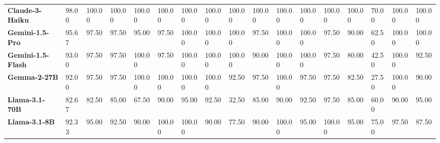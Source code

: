 \begin{table}[h]
\begin{adjustbox}{angle=90}
{\begin{tabular}{lllllllllllllllll}
\textbf{Claude-3-Haiku}    & 98.00                       & 100.00                   & 100.00              & 100.00       & 100.00                     & 100.00             & 100.00               & 100.00                 & 100.00                      & 100.00              & 100.00                     & 100.00                        & 100.00                 & 70.00             & 100.00                    & 100.00             \\
\textbf{Gemini-1.5-Pro}    & 95.67                       & 97.50                    & 97.50               & 95.00        & 97.50                      & 100.00             & 100.00               & 100.00                 & 97.50                       & 100.00              & 100.00                     & 97.50                         & 90.00                  & 62.50             & 100.00                    & 100.00             \\
\textbf{Gemini-1.5-Flash}  & 93.00                       & 97.50                    & 97.50               & 100.00       & 97.50                      & 100.00             & 100.00               & 100.00                 & 90.00                       & 100.00              & 100.00                     & 97.50                         & 80.00                  & 42.50             & 100.00                    & 92.50              \\
\textbf{Gemma-2-27B}       & 92.00                       & 97.50                    & 97.50               & 100.00       & 100.00                     & 100.00             & 100.00               & 92.50                  & 97.50                       & 100.00              & 97.50                      & 97.50                         & 82.50                  & 27.50             & 100.00                    & 90.00              \\
\textbf{Llama-3.1-70B}     & 82.67                       & 82.50                    & 85.00               & 67.50        & 90.00                      & 95.00              & 92.50                & 32.50                  & 85.00                       & 90.00               & 92.50                      & 97.50                         & 85.00                  & 60.00             & 90.00                     & 95.00              \\
\textbf{Llama-3.1-8B}      & 92.33                       & 95.00                    & 92.50               & 90.00        & 100.00                     & 100.00             & 90.00                & 77.50                  & 90.00                       & 100.00              & 95.00                      & 100.00                        & 95.00                  & 75.00             & 97.50                     & 87.50              \\

\end{tabular}}
\end{adjustbox}
\end{table}
